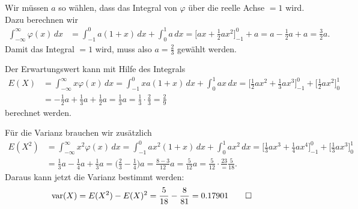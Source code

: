 \begin{loesung}
\begin{teilaufgaben}
\item
Wir müssen $a$ so wählen, dass das Integral von $\varphi$ über die reelle
Achse $=1$ wird.
Dazu berechnen wir
\begin{align*}
\int_{-\infty}^\infty\varphi(x)\,dx
&=
\int_{-1}^0a(1+x)\,dx +\int_0^1 a\,dx
=
\biggl[ax+\frac12ax^2\biggr]_{-1}^0 + a
=
a-\frac12a+a=\frac32a.
\end{align*}
Damit das Integral $=1$ wird, muss also $a=\frac23$ gewählt werden.
\item
Der Erwartungswert kann mit Hilfe des Integrals
\begin{align*}
E(X)
&=
\int_{-\infty}^\infty x\varphi(x)\,dx
=
\int_{-1}^0 xa(1+x)\,dx + \int_0^1ax\,dx
=
\biggl[
\frac12ax^2+\frac13ax^3
\biggr]_{-1}^0
+
\biggl[
\frac12ax^2
\biggr]_0^1
\\
&=
-\frac12a +\frac13a +\frac12a=\frac13a=\frac13\cdot\frac23=\frac29
\end{align*}
berechnet werden.
\item
Für die Varianz brauchen wir zusätzlich
\begin{align*}
E(X^2)
&=
\int_{-\infty}^\infty x^2\varphi(x)\,dx
=
\int_{-1}^0 ax^2(1+x)\,dx +\int_0^1 ax^2\,dx
=
\biggl[
\frac13ax^3 + \frac14ax^4
\biggr]_{-1}^0
+
\biggl[
\frac13ax^3
\biggr]_0^1
\\
&=
\frac13a - \frac14a + \frac13a
=
\biggl(\frac23-\frac14)a
=
\frac{8-3}{12}a
=
\frac5{12}a=\frac5{12}\cdot\frac{23}=\frac{5}{18}.
\end{align*}
Daraus kann jetzt die Varianz bestimmt werden:
\begin{align*}
\operatorname{var}(X)
&=
E(X^2)-E(X)^2
=
\frac{5}{18}-\frac{8}{81}
=
0.17901
\qedhere
\end{align*}
\end{teilaufgaben}
\end{loesung}



